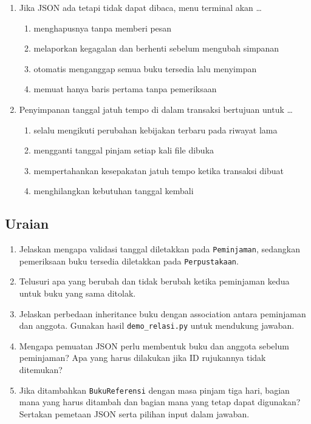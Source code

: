 \begin{enumerate}
  \begin{enumerate}[label=\alph*.,itemsep=0pt]
    \item selalu bertambah dua
    \item selalu kembali ke satu
    \item berubah menjadi kode anggota
    \item tetap karena catatan baru belum berhasil dibuat
  \end{enumerate}
  \item Jika JSON ada tetapi tidak dapat dibaca, menu terminal akan \ldots
  \begin{enumerate}[label=\alph*.,itemsep=0pt]
    \item menghapusnya tanpa memberi pesan
    \item melaporkan kegagalan dan berhenti sebelum mengubah simpanan
    \item otomatis menganggap semua buku tersedia lalu menyimpan
    \item memuat hanya baris pertama tanpa pemeriksaan
  \end{enumerate}
  \item Penyimpanan tanggal jatuh tempo di dalam transaksi bertujuan untuk \ldots
  \begin{enumerate}[label=\alph*.,itemsep=0pt]
    \item selalu mengikuti perubahan kebijakan terbaru pada riwayat lama
    \item mengganti tanggal pinjam setiap kali file dibuka
    \item mempertahankan kesepakatan jatuh tempo ketika transaksi dibuat
    \item menghilangkan kebutuhan tanggal kembali
  \end{enumerate}
\end{enumerate}

\subsection{Uraian}

\begin{enumerate}
  \item Jelaskan mengapa validasi tanggal diletakkan pada \texttt{Peminjaman}, sedangkan pemeriksaan buku tersedia diletakkan pada \texttt{Perpustakaan}.
  \item Telusuri apa yang berubah dan tidak berubah ketika peminjaman kedua untuk buku yang sama ditolak.
  \item Jelaskan perbedaan inheritance buku dengan association antara peminjaman dan anggota. Gunakan hasil \texttt{demo\_relasi.py} untuk mendukung jawaban.
  \item Mengapa pemuatan JSON perlu membentuk buku dan anggota sebelum peminjaman? Apa yang harus dilakukan jika ID rujukannya tidak ditemukan?
  \item Jika ditambahkan \texttt{BukuReferensi} dengan masa pinjam tiga hari, bagian mana yang harus ditambah dan bagian mana yang tetap dapat digunakan? Sertakan pemetaan JSON serta pilihan input dalam jawaban.
\end{enumerate}

